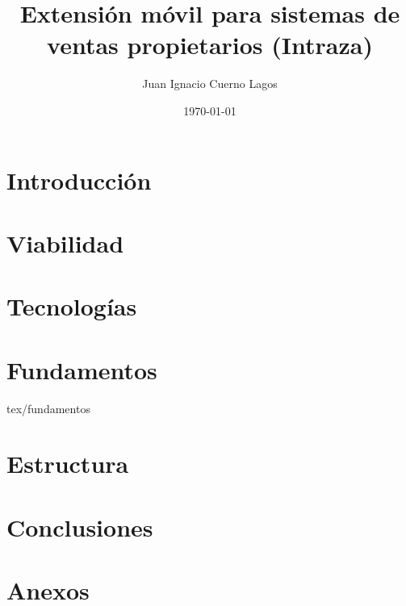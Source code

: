 \documentclass[a4paper,12pt,oneside]{scrbook}
\title{Extensión móvil para sistemas de ventas propietarios (Intraza)}
\author{Juan Ignacio Cuerno Lagos}
\date{\today}
\begin{document}
\frontmatter %

\tableofcontents %
\listoffigures %


\mainmatter %
\part{Introducción}
	

\part{Viabilidad}
	
	
\part{Tecnologías}
	
\part{Fundamentos}
	 {tex/fundamentos}	
\part{Estructura}
	
\part{Conclusiones}
	
\part {Anexos}
	
	
	
	


\backmatter



\end{document}

